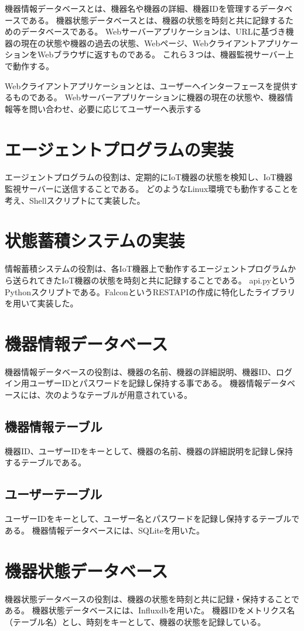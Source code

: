 機器情報データベースとは、機器名や機器の詳細、機器IDを管理するデータベースである。
機器状態データベースとは、機器の状態を時刻と共に記録するためのデータベースである。
Webサーバーアプリケーションは、URLに基づき機器の現在の状態や機器の過去の状態、Webページ、WebクライアントアプリケーションをWebブラウザに返すものである。
これら３つは、機器監視サーバー上で動作する。

Webクライアントアプリケーションとは、ユーザーへインターフェースを提供するものである。
Webサーバーアプリケーションに機器の現在の状態や、機器情報等を問い合わせ、必要に応じてユーザーへ表示する

\section{エージェントプログラムの実装}
エージェントプログラムの役割は、定期的にIoT機器の状態を検知し、IoT機器監視サーバーに送信することである。
どのようなLinux環境でも動作することを考え、Shellスクリプトにて実装した。

\section{状態蓄積システムの実装}
情報蓄積システムの役割は、各IoT機器上で動作するエージェントプログラムから送られてきたIoT機器の状態を時刻と共に記録することである。
api.pyというPythonスクリプトである。FalconというRESTAPIの作成に特化したライブラリを用いて実装した。

\section{機器情報データベース}
機器情報データベースの役割は、機器の名前、機器の詳細説明、機器ID、ログイン用ユーザーIDとパスワードを記録し保持する事である。
機器情報データベースには、次のようなテーブルが用意されている。
\subsection{機器情報テーブル}
機器ID、ユーザーIDをキーとして、機器の名前、機器の詳細説明を記録し保持するテーブルである。
\subsection{ユーザーテーブル}
ユーザーIDをキーとして、ユーザー名とパスワードを記録し保持するテーブルである。
機器情報データベースには、SQLiteを用いた。

\section{機器状態データベース}
機器状態データベースの役割は、機器の状態を時刻と共に記録・保持することである。
機器状態データベースには、Influxdbを用いた。
機器IDをメトリクス名（テーブル名）とし、時刻をキーとして、機器の状態を記録している。

